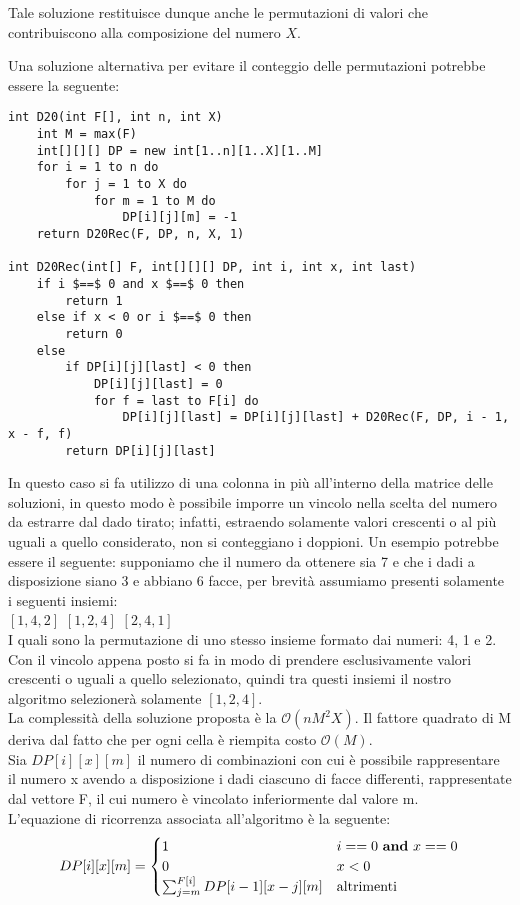 \documentclass[../cheatSheetAlgoritmi.tex]{subfiles}
\begin{document}
Tale soluzione restituisce dunque anche le permutazioni di valori che contribuiscono alla composizione del numero $X$.

\bigskip
Una soluzione alternativa per evitare il conteggio delle permutazioni potrebbe essere la seguente:
\begin{lstlisting}[caption= D20 senza permutazioni]
int D20(int F[], int n, int X)
    int M = max(F)
    int[][][] DP = new int[1..n][1..X][1..M]
    for i = 1 to n do
        for j = 1 to X do
            for m = 1 to M do
                DP[i][j][m] = -1
    return D20Rec(F, DP, n, X, 1)

int D20Rec(int[] F, int[][][] DP, int i, int x, int last)
    if i $==$ 0 and x $==$ 0 then
        return 1
    else if x < 0 or i $==$ 0 then
        return 0
    else
        if DP[i][j][last] < 0 then
            DP[i][j][last] = 0
            for f = last to F[i] do
                DP[i][j][last] = DP[i][j][last] + D20Rec(F, DP, i - 1, x - f, f)
        return DP[i][j][last]
\end{lstlisting}
In questo caso si fa utilizzo di una colonna in più all'interno della matrice delle soluzioni, in questo modo è possibile imporre un vincolo nella scelta del numero da estrarre dal dado tirato; infatti, estraendo solamente valori crescenti o al più uguali a quello considerato, non si conteggiano i doppioni. Un esempio potrebbe essere il seguente: supponiamo che il numero da ottenere sia 7 e che i dadi a disposizione siano 3 e abbiano 6 facce, per brevità assumiamo presenti solamente i seguenti insiemi: \\
$[1, 4, 2]$ $[1, 2, 4]$  $[2, 4, 1]$ \\
I quali sono la permutazione di uno stesso insieme formato dai numeri: 4, 1 e 2. Con il vincolo appena posto si fa in modo di prendere esclusivamente valori crescenti o uguali a quello selezionato, quindi tra questi insiemi il nostro algoritmo selezionerà solamente $[1, 2, 4]$. \\
La complessità della soluzione proposta è la $\mathcal{O}(nM^2X)$. Il fattore quadrato di M deriva dal fatto che per ogni cella è riempita costo $\mathcal{O}(M)$. \\
Sia $DP[i][x][m]$ il numero di combinazioni con cui è possibile rappresentare il numero x avendo a disposizione i dadi ciascuno di facce differenti, rappresentate dal vettore F, il cui numero è vincolato inferiormente dal valore m. \\
L'equazione di ricorrenza associata all'algoritmo è la seguente: 
\begin{equation*}
    DP[i][x][m]=\begin{cases}
        1 & \text{$i == 0$ \textbf{and} $x == 0$}\\
        0 & \text{$x < 0$} \\
        \sum_{j = m}^{F[i]} DP[i-1][x - j][m] & \text{altrimenti}
    \end{cases}
\end{equation*} \\
\end{document}
